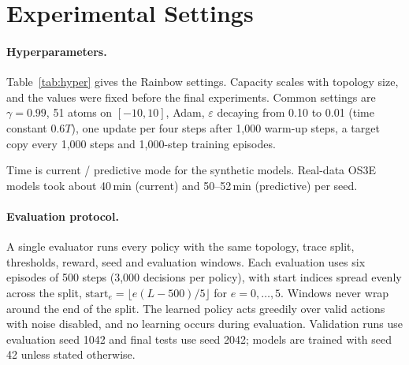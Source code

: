 \section{Experimental Settings}
\label{sec:settings}

\paragraph{Hyperparameters.} Table~\ref{tab:hyper} gives the Rainbow settings. Capacity scales with topology size, and the values were fixed before the final experiments. Common settings are $\gamma=0.99$, 51 atoms on $[-10,10]$, Adam, $\varepsilon$ decaying from 0.10 to 0.01 (time constant $0.6T$), one update per four steps after 1,000 warm-up steps, a target copy every 1,000 steps and 1,000-step training episodes.

\begin{table}[htbp]
\centering
\caption{Topology-dependent Rainbow DQN hyperparameters and recorded CPU training time.}
\label{tab:hyper}
\small
{}
\par\smallskip\footnotesize Time is current / predictive mode for the synthetic models. Real-data OS3E models took about 40\,min (current) and 50--52\,min (predictive) per seed.
\end{table}

\paragraph{Evaluation protocol.} A single evaluator runs every policy with the same topology, trace split, thresholds, reward, seed and evaluation windows. Each evaluation uses six episodes of 500 steps (3,000 decisions per policy), with start indices spread evenly across the split, $\text{start}_e=\lfloor e(L-500)/5\rfloor$ for $e=0,\dots,5$. Windows never wrap around the end of the split. The learned policy acts greedily over valid actions with noise disabled, and no learning occurs during evaluation. Validation runs use evaluation seed 1042 and final tests use seed 2042; models are trained with seed 42 unless stated otherwise.

